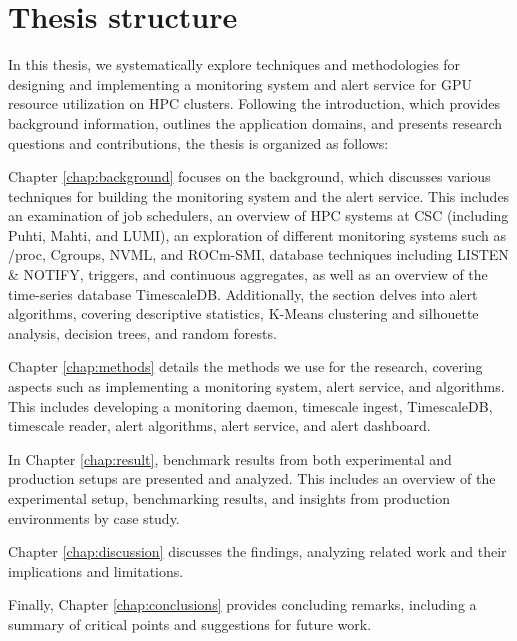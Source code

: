 \section{Thesis structure}

In this thesis, we systematically explore techniques and methodologies for designing and implementing a monitoring system and alert service for GPU resource utilization on HPC clusters. Following the introduction, which provides background information, outlines the application domains, and presents research questions and contributions, the thesis is organized as follows:

Chapter \ref{chap:background} focuses on the background, which discusses various techniques for building the monitoring system and the alert service. This includes an examination of job schedulers, an overview of HPC systems at CSC (including Puhti, Mahti, and LUMI), an exploration of different monitoring systems such as /proc, Cgroups, NVML, and ROCm-SMI, database techniques including LISTEN \& NOTIFY, triggers, and continuous aggregates, as well as an overview of the time-series database TimescaleDB. Additionally, the section delves into alert algorithms, covering descriptive statistics, K-Means clustering and silhouette analysis, decision trees, and random forests.

Chapter \ref{chap:methods} details the methods we use for the research, covering aspects such as implementing a monitoring system, alert service, and algorithms. This includes developing a monitoring daemon, timescale ingest, TimescaleDB, timescale reader, alert algorithms, alert service, and alert dashboard.

In Chapter \ref{chap:result}, benchmark results from both experimental and production setups are presented and analyzed. This includes an overview of the experimental setup, benchmarking results, and insights from production environments by case study.

Chapter \ref{chap:discussion} discusses the findings, analyzing related work and their implications and limitations.

Finally, Chapter \ref{chap:conclusions} provides concluding remarks, including a summary of critical points and suggestions for future work.
